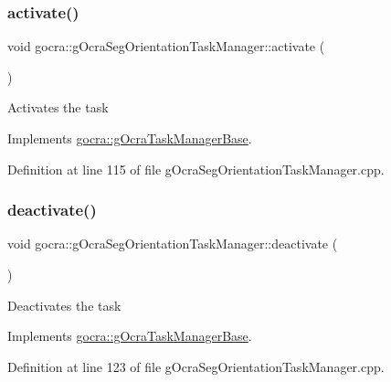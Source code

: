 \subsubsection{\texorpdfstring{activate()}{activate()}}
{\footnotesize\ttfamily void gocra\+::g\+Ocra\+Seg\+Orientation\+Task\+Manager\+::activate (\begin{DoxyParamCaption}{ }\end{DoxyParamCaption})\hspace{0.3cm}{\ttfamily [virtual]}}

Activates the task 

Implements \hyperlink{classgocra_1_1gOcraTaskManagerBase_a50cf1c408749d6e9dcfaf50bcab77dee}{gocra\+::g\+Ocra\+Task\+Manager\+Base}.



Definition at line 115 of file g\+Ocra\+Seg\+Orientation\+Task\+Manager.\+cpp.

\hypertarget{classgocra_1_1gOcraSegOrientationTaskManager_a5ebf0c1a5813c6a2895965d973f77539}{}\label{classgocra_1_1gOcraSegOrientationTaskManager_a5ebf0c1a5813c6a2895965d973f77539} 
\subsubsection{\texorpdfstring{deactivate()}{deactivate()}}
{\footnotesize\ttfamily void gocra\+::g\+Ocra\+Seg\+Orientation\+Task\+Manager\+::deactivate (\begin{DoxyParamCaption}{ }\end{DoxyParamCaption})\hspace{0.3cm}{\ttfamily [virtual]}}

Deactivates the task 

Implements \hyperlink{classgocra_1_1gOcraTaskManagerBase_a7cf9111e69aee47a39fe0f2976a20d6c}{gocra\+::g\+Ocra\+Task\+Manager\+Base}.



Definition at line 123 of file g\+Ocra\+Seg\+Orientation\+Task\+Manager.\+cpp.

\hypertarget{classgocra_1_1gOcraSegOrientationTaskManager_aa702c1703f667054e3d84e9a6791d15f}{}\label{classgocra_1_1gOcraSegOrientationTaskManager_aa702c1703f667054e3d84e9a6791d15f} 
